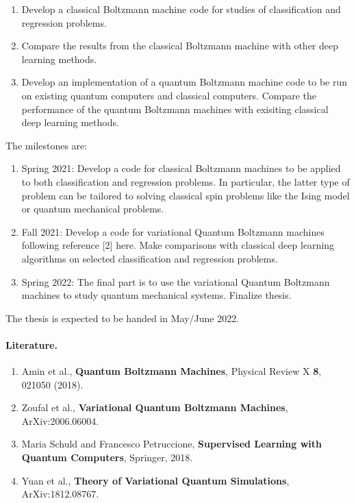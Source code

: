 \documentclass[%
oneside,                 %
final,                   %
10pt]{article}
\begin{document}
\begin{enumerate}
\item Develop a classical Boltzmann machine code for studies of classification and regression problems.

\item Compare the results from the classical Boltzmann machine with other deep learning methods.

\item Develop an implementation of a quantum Boltzmann machine code to be run on existing quantum computers and classical computers. Compare the performance of the quantum Boltzmann machines with exisiting classical deep learning methods.
\end{enumerate}

\noindent
The milestones are:
\begin{enumerate}
\item Spring 2021: Develop a code for classical Boltzmann machines to be applied to both classification and regression problems. In particular, the latter type of problem can be tailored to solving classical spin problems like the Ising model or quantum mechanical problems. 

\item Fall 2021: Develop a code for variational Quantum Boltzmann machines following reference [2] here.  Make comparisons with classical deep learning algorithms on selected classification and regression problems.

\item Spring 2022: The final part is to use the variational Quantum Boltzmann machines to study quantum mechanical systems. Finalize thesis. 
\end{enumerate}

\noindent
The thesis is expected to be handed in May/June 2022.

\paragraph{Literature.}
\begin{enumerate}
\item Amin et al., \textbf{Quantum Boltzmann Machines}, Physical Review X \textbf{8}, 021050 (2018).

\item Zoufal et al., \textbf{Variational Quantum Boltzmann Machines}, ArXiv:2006.06004.

\item Maria Schuld and Francesco Petruccione, \textbf{Supervised Learning with Quantum Computers}, Springer, 2018.

\item Yuan et al., \textbf{Theory of Variational Quantum Simulations}, ArXiv:1812.08767. 
\end{enumerate}

\noindent

\end{document}
